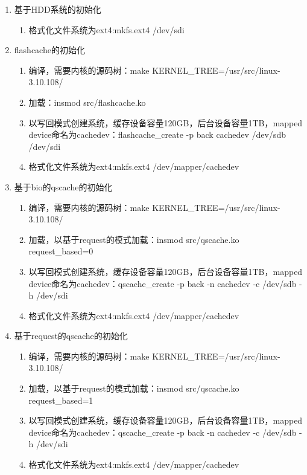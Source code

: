 \begin{enumerate}
    \item 基于HDD系统的初始化
          \begin{enumerate}
              \item 格式化文件系统为ext4:mkfs.ext4 /dev/sdi
          \end{enumerate}
    \item flashcache的初始化
    \begin{enumerate}
        \item 编译，需要内核的源码树：make KERNEL\_TREE=/usr/src/linux-3.10.108/
        \item 加载：insmod src/flashcache.ko
        \item 以写回模式创建系统，缓存设备容量120GB，后台设备容量1TB，mapped device命名为cachedev：flashcache\_create -p back cachedev /dev/sdb /dev/sdi
        \item 格式化文件系统为ext4:mkfs.ext4 /dev/mapper/cachedev
    \end{enumerate}
    \item 基于bio的qscache的初始化
    \begin{enumerate}
        \item 编译，需要内核的源码树：make KERNEL\_TREE=/usr/src/linux-3.10.108/
        \item 加载，以基于request的模式加载：insmod src/qscache.ko request\_based=0
        \item 以写回模式创建系统，缓存设备容量120GB，后台设备容量1TB，mapped device命名为cachedev：qscache\_create -p back -n cachedev -c /dev/sdb -h /dev/sdi
        \item 格式化文件系统为ext4:mkfs.ext4 /dev/mapper/cachedev
    \end{enumerate}
    \item 基于request的qscache的初始化
    \begin{enumerate}
        \item 编译，需要内核的源码树：make KERNEL\_TREE=/usr/src/linux-3.10.108/
        \item 加载，以基于request的模式加载：insmod src/qscache.ko request\_based=1
        \item 以写回模式创建系统，缓存设备容量120GB，后台设备容量1TB，mapped device命名为cachedev：qscache\_create -p back -n cachedev -c /dev/sdb -h /dev/sdi
        \item 格式化文件系统为ext4:mkfs.ext4 /dev/mapper/cachedev
    \end{enumerate}
\end{enumerate}

